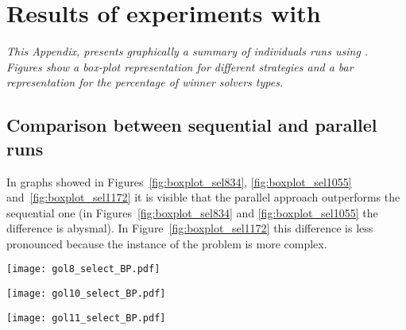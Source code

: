 \chapter{Results of experiments with \grp}
\label{app:grp}
\textit{This Appendix, presents graphically a summary of individuals runs using \grp. Figures show a \textit{box-plot} representation for different strategies and a bar representation for the percentage of winner solvers types.}
\vfill
\newpage

\section{Comparison between sequential and parallel runs}

\begin{minipage}[c]{0.45\textwidth}
In graphs showed in Figures~\ref{fig:boxplot_sel834}, \ref{fig:boxplot_sel1055} and~\ref{fig:boxplot_sel1172} it is visible that the parallel approach outperforms the sequential one (in Figures~\ref{fig:boxplot_sel834} and \ref{fig:boxplot_sel1055} the difference is abysmal). In Figure~\ref{fig:boxplot_sel1172} this difference is less pronounced because the instance of the problem is more complex.
\end{minipage}
\hspace{0.05\textwidth}
\begin{minipage}[c]{0.45\textwidth}
\centering
\texttt{[image: gol8\_select\_BP.pdf]}
\label{fig:boxplot_sel834}
\end{minipage}


\begin{minipage}[c]{0.45\textwidth}
\centering
\texttt{[image: gol10\_select\_BP.pdf]}
\label{fig:boxplot_sel1055}
\end{minipage}\hspace{0.05\textwidth}
\begin{minipage}[c]{0.45\textwidth}
\centering
\texttt{[image: gol11\_select\_BP.pdf]}
\label{fig:boxplot_sel1172}
\end{minipage}


